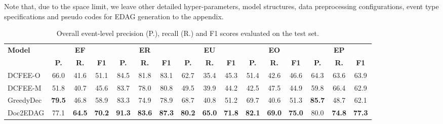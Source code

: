 \documentclass[11pt,a4paper]{article}
\begin{document}
Note that, due to the space limit, we leave other detailed hyper-parameters, model structures, data preprocessing configurations, event type specifications and pseudo codes for EDAG generation to the appendix.


\begin{table*}[tb]\small
\centering
\addtolength{\tabcolsep}{-1pt}
\begin{tabular}{l | ccc | ccc | ccc | ccc | ccc }
\toprule
\multirow{2}{*}{\textbf{Model}}
& \multicolumn{3}{c|}{\textbf{EF}}
& \multicolumn{3}{c|}{\textbf{ER}}
& \multicolumn{3}{c|}{\textbf{EU}}
& \multicolumn{3}{c|}{\textbf{EO}}
& \multicolumn{3}{c}{\textbf{EP}}
\\
& \textbf{P.} & \textbf{R.} & \textbf{F1}
& \textbf{P.} & \textbf{R.} & \textbf{F1}
& \textbf{P.} & \textbf{R.} & \textbf{F1}
& \textbf{P.} & \textbf{R.} & \textbf{F1}
& \textbf{P.} & \textbf{R.} & \textbf{F1}
\\
\midrule
DCFEE-O  & 66.0 & 41.6 & 51.1      & 84.5 & 81.8 & 83.1      & 62.7 & 35.4 & 45.3      & 51.4 & 42.6 & 46.6      & 64.3 & 63.6 & 63.9      
\\
DCFEE-M & 51.8 & 40.7 & 45.6 	 & 83.7 & 78.0 & 80.8 	 & 49.5 & 39.9 & 44.2 	 & 42.5 & 47.5 & 44.9 	 & 59.8 & 66.4 & 62.9 
\\
\midrule
GreedyDec  
& \textbf{79.5} & 46.8 & 58.9      & 83.3 & 74.9 & 78.9      & 68.7 & 40.8 & 51.2      & 69.7 & 40.6 & 51.3      & \textbf{85.7} & 48.7 & 62.1
\\
Doc2EDAG  
& 77.1 & \textbf{64.5} & \textbf{70.2}      & \textbf{91.3} & \textbf{83.6} & \textbf{87.3}      & \textbf{80.2} & \textbf{65.0} & \textbf{71.8}      & \textbf{82.1} & \textbf{69.0} & \textbf{75.0}      & 80.0 & \textbf{74.8} & \textbf{77.3}
\\
\bottomrule
\end{tabular}
\caption{Overall event-level precision (P.), recall (R.) and F1 scores evaluated on the test set.}
\label{tab:main_result}
\end{table*}
\end{document}
